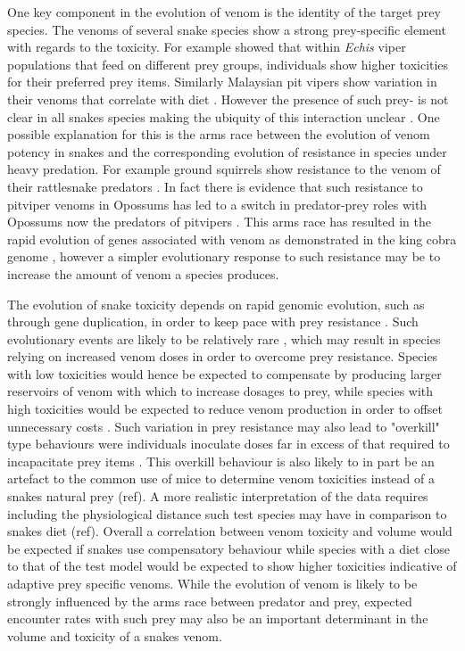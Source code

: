 One key component in the evolution of venom is the identity of the target prey species. The venoms of several snake species show a strong prey-specific element with regards to the toxicity. For example \cite{barlow2009coevolution} showed that within \textit{Echis} viper populations that feed on different prey groups, individuals show higher toxicities for their preferred prey items. Similarly Malaysian pit vipers show variation in their venoms that correlate with diet \citep{daltry1996diet}. However the presence of such prey- is not clear in all snakes species making the ubiquity of this interaction unclear \citep{williams1988variation}. One possible explanation for this is the arms race between the evolution of venom potency in snakes and the corresponding evolution of resistance in species under heavy predation. For example ground squirrels show resistance to the venom of their rattlesnake predators \citep{poran1987resistance}. In fact there is evidence that such resistance to pitviper venoms in Opossums has led to a switch in predator-prey roles with Opossums now the predators of pitvipers \citep{voss2013opossums}. This arms race has resulted in the rapid evolution of genes associated with venom as demonstrated in the king cobra genome \citep{vonk2013king}, however a simpler evolutionary response to such resistance may be to increase the amount of venom a species produces.


The evolution of snake toxicity depends on rapid genomic evolution, such as through gene duplication, in order to keep pace with prey resistance \citep{vonk2013king}. Such evolutionary events are likely to be relatively rare \citep{vonk2013king}, which may result in species relying on increased venom doses in order to overcome prey resistance. Species with low toxicities would hence be expected to compensate by producing larger reservoirs of venom with which to increase dosages to prey, while species with high toxicities would be expected to reduce venom production in order to offset unnecessary costs \citep{mccue2006cost}. Such variation in prey resistance may also lead to "overkill" type behaviours were individuals inoculate doses far in excess of that required to incapacitate prey items \citep{sasa1999diet,mebs2001toxicity}. This overkill behaviour is also likely to in part be an artefact to the common use of mice to determine venom toxicities instead of a snakes natural prey (ref). A more realistic interpretation of the data requires including the physiological distance such test species may have in comparison to snakes diet (ref). Overall a correlation between venom toxicity and volume would be expected if snakes use compensatory behaviour while species with a diet close to that of the test model would be expected to show higher toxicities indicative of adaptive prey specific venoms. While the evolution of venom is likely to be strongly influenced by the arms race between predator and prey, expected encounter rates with such prey may also be an important determinant in the volume and toxicity of a snakes venom.


